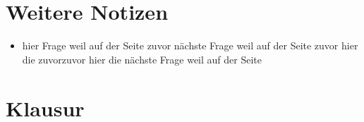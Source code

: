 \documentclass[a4paper,10pt]{article}
\begin{document}
\section{Weitere Notizen}

\lipsum[1]
\begin{itemize}[itemsep=0pt]
\item[\miusquare] hier Frage weil auf der Seite zuvor 
\niu nächste Frage weil auf der Seite zuvor hier die 
\niu zuvorzuvor hier die nächste Frage weil auf der Seite 
\end{itemize}

\section{Klausur}

	
	
\end{document}
